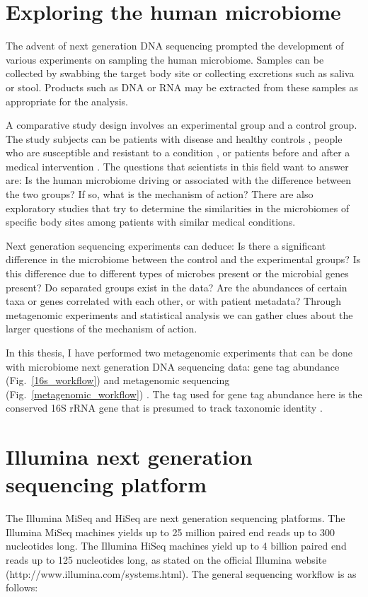\section{Exploring the human microbiome}
The advent of next generation DNA sequencing prompted the development of various experiments on sampling the human microbiome. Samples can be collected by swabbing the target body site or collecting excretions such as saliva or stool. Products such as DNA or RNA may be extracted from these samples as appropriate for the analysis.

A comparative study design involves an experimental group and a control group. The study subjects can be patients with disease and healthy controls \cite{macklaim2013comparative}, people who are susceptible and resistant to a condition \cite{theriot2014antibiotic}, or patients before and after a medical intervention \cite{graessler2013metagenomic}. The questions that scientists in this field want to answer are: Is the human microbiome driving or associated with the difference between the two groups? If so, what is the mechanism of action? There are also exploratory studies that try to determine the similarities in the microbiomes of specific body sites among patients with similar medical conditions.

Next generation sequencing experiments can deduce: Is there a significant difference in the microbiome between the control and the experimental groups? Is this difference due to different types of microbes present or the microbial genes present? Do separated groups exist in the data? Are the abundances of certain taxa or genes correlated with each other, or with patient metadata? Through metagenomic experiments and statistical analysis we can gather clues about the larger questions of the mechanism of action.

In this thesis, I have performed two metagenomic experiments that can be done with microbiome next generation DNA sequencing data: gene tag abundance (Fig.~\ref{16s_workflow}) and metagenomic sequencing (Fig.~\ref{metagenomic_workflow}) \cite{riesenfeld2004metagenomics}. The tag used for gene tag abundance here is the conserved 16S rRNA gene that is presumed to track taxonomic identity \cite{gloor2010microbiome}.

\section{Illumina next generation sequencing platform}
The Illumina MiSeq and HiSeq are next generation sequencing platforms. The Illumina MiSeq machines yields up to 25 million paired end reads up to 300 nucleotides long. The Illumina HiSeq machines yield up to 4 billion paired end reads up to 125 nucleotides long, as stated on the official Illumina website (http://www.illumina.com/systems.html). The general sequencing workflow is as follows:

